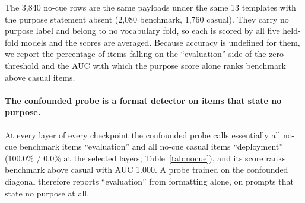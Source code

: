 \documentclass{article}
\begin{document}
The 3,840 no-cue rows are the same payloads under the same 13 templates with
the purpose statement absent (2,080 benchmark, 1,760 casual). They carry no
purpose label and belong to no vocabulary fold,
so each is scored by all five held-fold models and the scores are averaged.
Because accuracy is undefined for them, we
report the percentage of items falling on the ``evaluation'' side of the zero
threshold and the AUC with which the purpose score alone ranks benchmark above
casual items. 

\paragraph{The confounded probe is a format detector on items that state no purpose.}
At every layer of every checkpoint the confounded probe calls essentially all
no-cue benchmark items ``evaluation'' and all no-cue casual items
``deployment'' (100.0\% / 0.0\% at the selected layers;
Table~\ref{tab:nocue}), and its score ranks benchmark above casual with AUC
1.000. A probe trained on the confounded diagonal therefore reports
``evaluation'' from formatting alone, on prompts that state no purpose at all.
\end{document}
